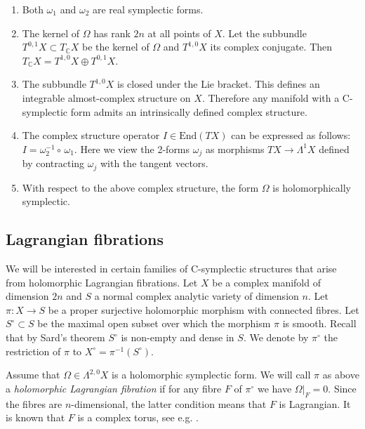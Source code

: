 \documentclass[10pt]{amsart}
\newcommand{\bbC}{\mathbb{C}}
\newcommand{\emrp}{\mathrm{End}}
\begin{document}
\begin{enumerate}
\item Both $\omega_1$ and $\omega_2$ are real symplectic forms.
\item The kernel of $\Omega$ has rank $2n$ at all points of $X$.
Let the subbundle $T^{0,1}X \subset T_{\bbC}X$ be the
kernel of $\Omega$ and $T^{1,0}X$ its complex conjugate. Then
$T_{\bbC}X = T^{1,0}X\oplus T^{0,1}X$.
\item The subbundle $T^{1,0}X$ is closed under the Lie bracket.
This defines an integrable almost-complex structure on $X$. Therefore
any manifold with a C-symplectic form admits an intrinsically defined
complex structure.
\item The complex structure operator $I\in \emrp(TX)$ can be
expressed as follows: $I = \omega_2^{-1}\circ\,\omega_1$. Here we view
the 2-forms $\omega_j$ as morphisms $TX\to \Lambda^1 X$ defined by
contracting $\omega_j$ with the tangent vectors.
\item With respect to the above complex structure, the form $\Omega$
is holomorphically symplectic.
\end{enumerate}

\subsection{Lagrangian fibrations}\label{sec_Lag} We will be interested in certain families
of C-sym\-plectic structures that arise from holomorphic Lagrangian fibrations.
Let $X$ be a complex manifold of dimension $2n$ and $S$ a normal complex analytic
variety of dimension $n$.
Let $\pi\colon X\to S$ be a proper surjective holomorphic morphism with connected fibres.
Let $S^\circ \subset S$ be the maximal open subset over which the morphism $\pi$
is smooth. Recall that by Sard's theorem $S^\circ$ is non-empty and dense in $S$.
We denote by $\pi^\circ$ the restriction of $\pi$ to $X^\circ = \pi^{-1}(S^\circ)$.

Assume that $\Omega\in\Lambda^{2,0}X$ is a holomorphic symplectic form. 
We will call $\pi$ as above a {\it holomorphic Lagrangian fibration} if for any fibre $F$ of $\pi^\circ$
we have $\Omega|_F = 0$. Since the fibres are $n$-dimensional,
the latter condition means that $F$ is Lagrangian.
It is known that $F$ is a complex torus, see e.g. \cite[Theorem 2.6]{DM}.
\end{document}
